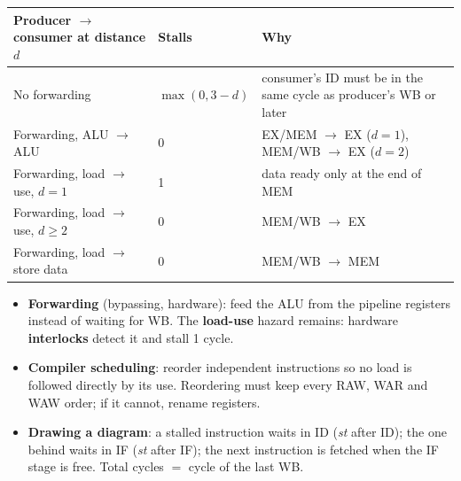 \begin{center}
\small
\begin{tabular}{@{}p{5cm}lp{6.2cm}@{}}
\toprule
Producer $\to$ consumer at distance $d$ & Stalls & Why \\
\midrule
No forwarding & $\max(0,3-d)$ & consumer's ID must be in the same cycle as producer's WB or later \\
Forwarding, ALU $\to$ ALU & 0 & EX/MEM $\to$ EX ($d=1$), MEM/WB $\to$ EX ($d=2$) \\
Forwarding, load $\to$ use, $d=1$ & 1 & data ready only at the end of MEM \\
Forwarding, load $\to$ use, $d\ge2$ & 0 & MEM/WB $\to$ EX \\
Forwarding, load $\to$ store data & 0 & MEM/WB $\to$ MEM \\
\bottomrule
\end{tabular}
\end{center}
\begin{itemize}[leftmargin=*]
  \item \textbf{Forwarding} (bypassing, hardware): feed the ALU from the pipeline
  registers instead of waiting for WB. The \textbf{load-use} hazard remains:
  hardware \textbf{interlocks} detect it and stall 1 cycle.
  \item \textbf{Compiler scheduling}: reorder independent instructions so no load is
  followed directly by its use. Reordering must keep every RAW, WAR and WAW order;
  if it cannot, rename registers.
  \item \textbf{Drawing a diagram}: a stalled instruction waits in ID
  (\textit{st} after ID); the one behind waits in IF (\textit{st} after IF); the
  next instruction is fetched when the IF stage is free. Total cycles $=$ cycle of
  the last WB.
\end{itemize}

